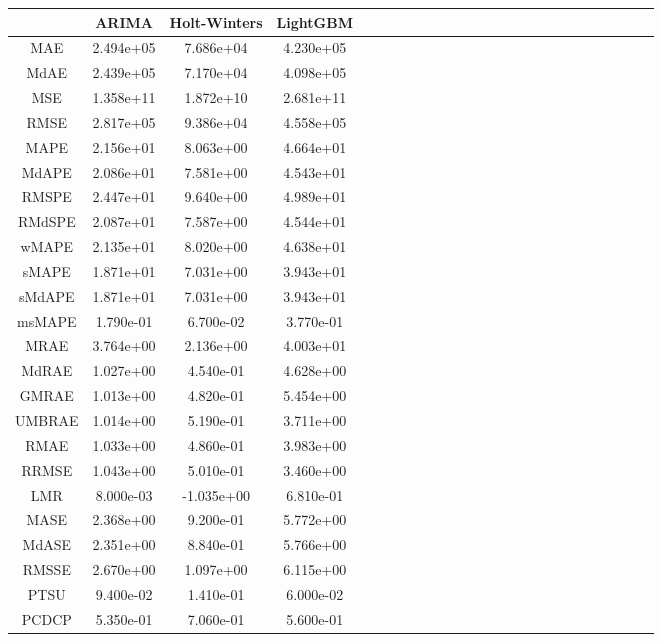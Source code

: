 \begin{tabular}{ccccccccccccccccccccccccc}
\toprule
 & ARIMA & Holt-Winters & LightGBM \\
\midrule
MAE & 2.494e+05 & 7.686e+04 & 4.230e+05 \\
MdAE & 2.439e+05 & 7.170e+04 & 4.098e+05 \\
MSE & 1.358e+11 & 1.872e+10 & 2.681e+11 \\
RMSE & 2.817e+05 & 9.386e+04 & 4.558e+05 \\
MAPE & 2.156e+01 & 8.063e+00 & 4.664e+01 \\
MdAPE & 2.086e+01 & 7.581e+00 & 4.543e+01 \\
RMSPE & 2.447e+01 & 9.640e+00 & 4.989e+01 \\
RMdSPE & 2.087e+01 & 7.587e+00 & 4.544e+01 \\
wMAPE & 2.135e+01 & 8.020e+00 & 4.638e+01 \\
sMAPE & 1.871e+01 & 7.031e+00 & 3.943e+01 \\
sMdAPE & 1.871e+01 & 7.031e+00 & 3.943e+01 \\
msMAPE & 1.790e-01 & 6.700e-02 & 3.770e-01 \\
MRAE & 3.764e+00 & 2.136e+00 & 4.003e+01 \\
MdRAE & 1.027e+00 & 4.540e-01 & 4.628e+00 \\
GMRAE & 1.013e+00 & 4.820e-01 & 5.454e+00 \\
UMBRAE & 1.014e+00 & 5.190e-01 & 3.711e+00 \\
RMAE & 1.033e+00 & 4.860e-01 & 3.983e+00 \\
RRMSE & 1.043e+00 & 5.010e-01 & 3.460e+00 \\
LMR & 8.000e-03 & -1.035e+00 & 6.810e-01 \\
MASE & 2.368e+00 & 9.200e-01 & 5.772e+00 \\
MdASE & 2.351e+00 & 8.840e-01 & 5.766e+00 \\
RMSSE & 2.670e+00 & 1.097e+00 & 6.115e+00 \\
PTSU & 9.400e-02 & 1.410e-01 & 6.000e-02 \\
PCDCP & 5.350e-01 & 7.060e-01 & 5.600e-01 \\
\bottomrule
\end{tabular}
